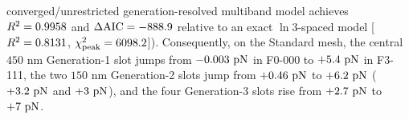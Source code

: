 \documentclass[pdflatex,sn-nature]{sn-jnl}
\DeclareRobustCommand{\roundone}[1]{\fpeval{round(#1,1)}}
\DeclareRobustCommand{\roundtwo}[1]{\fpeval{round(#1,2)}}
\DeclareRobustCommand{\roundthree}[1]{\fpeval{round(#1,3)}}
\DeclareRobustCommand{\roundfour}[1]{\fpeval{round(#1,4)}}
\begin{document}
converged/unrestricted generation-resolved multiband model achieves $R^2 = \roundfour{\NthreeUnithreedFoneoneoneModelUnresRtwo}$ and $\Delta\mathrm{AIC} = \roundone{\NthreeUnithreedFoneoneoneModelCompDaic}$ relative to an exact $\ln 3$-spaced model [$R^2 = \roundfour{\NthreeUnithreedFoneoneoneModelLnthreeRtwo}$, $\chi^2_{\rm peak} = \roundone{\NthreeUnithreedFoneoneoneModelLnthreePkChitwo}$]). Consequently, on the Standard mesh, the central $450\text{ nm}$ Generation-1 slot jumps from $\roundthree{\NthreeUnithreedSlotfourFzerozerozeroPn}\text{ pN}$ in F0-000 to $+\roundone{\NthreeUnithreedSlotfourFoneoneonePn}\text{ pN}$ in F3-111, the two $150\text{ nm}$ Generation-2 slots jump from $+\roundtwo{\NthreeUnithreedGentwoFzerozerozeroPn}\text{ pN}$ to $+\roundone{\NthreeUnithreedGentwoFoneoneonePn}\text{ pN}$ ($+\roundone{\NthreeUnithreedSlottwoFoneoneonePn}\text{ pN}$ and $+\roundone{\NthreeUnithreedSlotsixFoneoneonePn}\text{ pN}$), and the four Generation-3 slots rise from $+\roundone{\NthreeUnithreedGenthreeFzerozerozeroPn}\text{ pN}$ to $+\roundone{\NthreeUnithreedGenthreeFoneoneonePn}\text{ pN}$.
\end{document}
